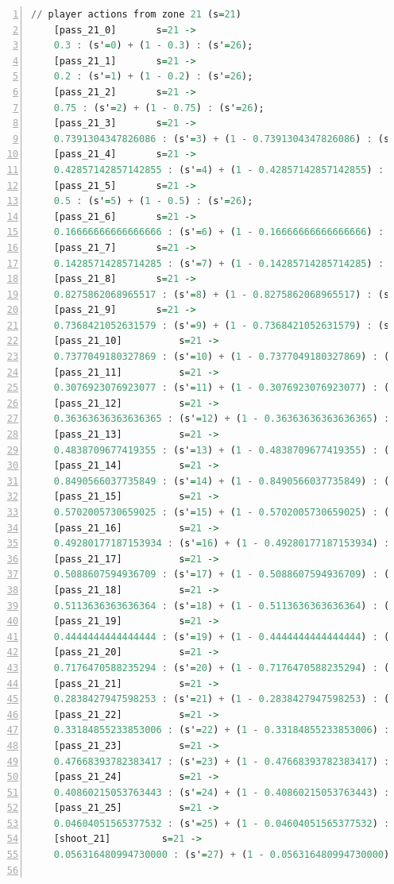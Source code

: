\documentclass{l4proj}
\begin{document}
\begin{appendices}
\begin{lstlisting}[language=Haskell, numbers=left, caption=MDP used for strategy generation. This is the model specification as-is after the refinements at the end of chapter 3.]
	// player actions from zone 21 (s=21)
	[pass_21_0]	      s=21 ->
	0.3 : (s'=0) + (1 - 0.3) : (s'=26);
	[pass_21_1]	      s=21 ->
	0.2 : (s'=1) + (1 - 0.2) : (s'=26);
	[pass_21_2]	      s=21 ->
	0.75 : (s'=2) + (1 - 0.75) : (s'=26);
	[pass_21_3]	      s=21 ->
	0.7391304347826086 : (s'=3) + (1 - 0.7391304347826086) : (s'=26);
	[pass_21_4]	      s=21 ->
	0.42857142857142855 : (s'=4) + (1 - 0.42857142857142855) : (s'=26);
	[pass_21_5]	      s=21 ->
	0.5 : (s'=5) + (1 - 0.5) : (s'=26);
	[pass_21_6]	      s=21 ->
	0.16666666666666666 : (s'=6) + (1 - 0.16666666666666666) : (s'=26);
	[pass_21_7]	      s=21 ->
	0.14285714285714285 : (s'=7) + (1 - 0.14285714285714285) : (s'=26);
	[pass_21_8]	      s=21 ->
	0.8275862068965517 : (s'=8) + (1 - 0.8275862068965517) : (s'=26);
	[pass_21_9]	      s=21 ->
	0.7368421052631579 : (s'=9) + (1 - 0.7368421052631579) : (s'=26);
	[pass_21_10]	      s=21 ->
	0.7377049180327869 : (s'=10) + (1 - 0.7377049180327869) : (s'=26);
	[pass_21_11]	      s=21 ->
	0.3076923076923077 : (s'=11) + (1 - 0.3076923076923077) : (s'=26);
	[pass_21_12]	      s=21 ->
	0.36363636363636365 : (s'=12) + (1 - 0.36363636363636365) : (s'=26);
	[pass_21_13]	      s=21 ->
	0.4838709677419355 : (s'=13) + (1 - 0.4838709677419355) : (s'=26);
	[pass_21_14]	      s=21 ->
	0.8490566037735849 : (s'=14) + (1 - 0.8490566037735849) : (s'=26);
	[pass_21_15]	      s=21 ->
	0.5702005730659025 : (s'=15) + (1 - 0.5702005730659025) : (s'=26);
	[pass_21_16]	      s=21 ->
	0.49280177187153934 : (s'=16) + (1 - 0.49280177187153934) : (s'=26);
	[pass_21_17]	      s=21 ->
	0.5088607594936709 : (s'=17) + (1 - 0.5088607594936709) : (s'=26);
	[pass_21_18]	      s=21 ->
	0.5113636363636364 : (s'=18) + (1 - 0.5113636363636364) : (s'=26);
	[pass_21_19]	      s=21 ->
	0.4444444444444444 : (s'=19) + (1 - 0.4444444444444444) : (s'=26);
	[pass_21_20]	      s=21 ->
	0.7176470588235294 : (s'=20) + (1 - 0.7176470588235294) : (s'=26);
	[pass_21_21]	      s=21 ->
	0.2838427947598253 : (s'=21) + (1 - 0.2838427947598253) : (s'=26);
	[pass_21_22]	      s=21 ->
	0.33184855233853006 : (s'=22) + (1 - 0.33184855233853006) : (s'=26);
	[pass_21_23]	      s=21 ->
	0.47668393782383417 : (s'=23) + (1 - 0.47668393782383417) : (s'=26);
	[pass_21_24]	      s=21 ->
	0.40860215053763443 : (s'=24) + (1 - 0.40860215053763443) : (s'=26);
	[pass_21_25]	      s=21 ->
	0.04604051565377532 : (s'=25) + (1 - 0.04604051565377532) : (s'=26);
	[shoot_21]	       s=21 ->
	0.056316480994730000 : (s'=27) + (1 - 0.056316480994730000) : (s'=26);


\end{lstlisting}
\end{appendices}
\end{document}
